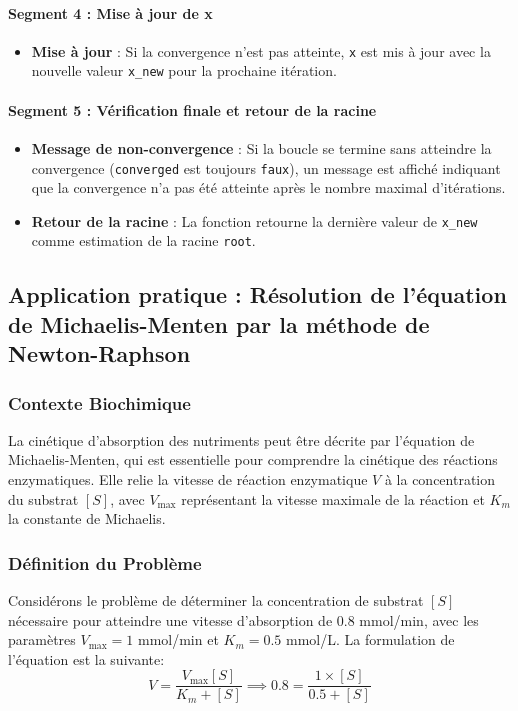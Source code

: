 \documentclass{article}
\begin{document}
\paragraph{Segment 4 : Mise à jour de x}
\begin{itemize}
    \item \textbf{Mise à jour} : Si la convergence n'est pas atteinte, \texttt{x} est mis à jour avec la nouvelle valeur \texttt{x\_new} pour la prochaine itération.
\end{itemize}

\paragraph{Segment 5 : Vérification finale et retour de la racine}
\begin{itemize}
    \item \textbf{Message de non-convergence} : Si la boucle se termine sans atteindre la convergence (\texttt{converged} est toujours \texttt{faux}), un message est affiché indiquant que la convergence n'a pas été atteinte après le nombre maximal d'itérations.
    \item \textbf{Retour de la racine} : La fonction retourne la dernière valeur de \texttt{x\_new} comme estimation de la racine \texttt{root}.
\end{itemize}

\subsection{Application pratique : Résolution de l'équation de Michaelis-Menten par la méthode de Newton-Raphson}

\subsubsection{Contexte Biochimique}
La cinétique d'absorption des nutriments peut être décrite par l'équation de Michaelis-Menten, qui est essentielle pour comprendre la cinétique des réactions enzymatiques. Elle relie la vitesse de réaction enzymatique \( V \) à la concentration du substrat \( [S] \), avec \( V_{\text{max}} \) représentant la vitesse maximale de la réaction et \( K_m \) la constante de Michaelis.

\subsubsection{Définition du Problème}
Considérons le problème de déterminer la concentration de substrat \( [S] \) nécessaire pour atteindre une vitesse d'absorption de \( 0.8 \) mmol/min, avec les paramètres \( V_{\text{max}} = 1 \) mmol/min et \( K_m = 0.5 \) mmol/L. La formulation de l'équation est la suivante:
\[
V = \frac{V_{\text{max}} [S]}{K_m + [S]} \implies 0.8 = \frac{1 \times [S]}{0.5 + [S]}
\]
\end{document}
